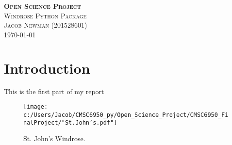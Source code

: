 \documentclass{article}
\begin{document}
\begin{titlepage}
\newcommand{\HRule}{\rule{\linewidth}{0.5mm}}

\center
\textsc{\LARGE \textbf{Open Science Project}}\\[1 cm]

\textsc{\Large Windrose Python Package}\\[0.5 cm]

\textsc{\large Jacob Newman (201528601)}\\[0.5 cm]





\vfill\vfill\vfill
{\large\today}
\vfill

\end{titlepage}


\section{Introduction}
This is the first part of my report

\begin{figure}[h!]
\texttt{[image: c:/Users/Jacob/CMSC6950\_py/Open\_Science\_Project/CMSC6950\_FinalProject/"St.John's.pdf"]}
\label{St._John's_Windrose}
\caption{St. John's Windrose.}
\end{figure}
\end{document}
